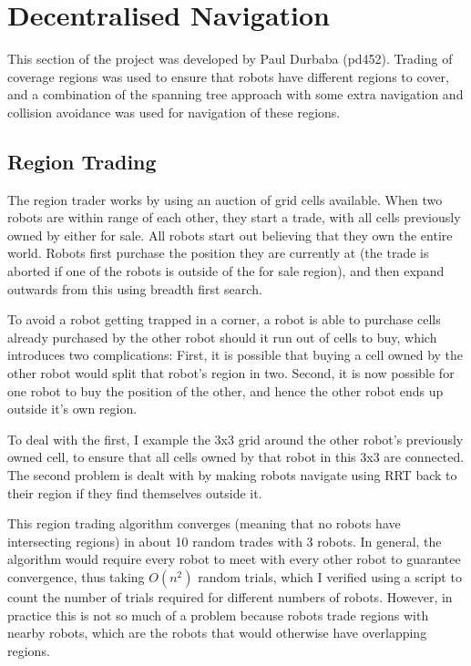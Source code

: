 \documentclass[a4paper, 10pt, conference]{ieeeconf}      %
\begin{document}
\section{Decentralised Navigation}
This section of the project was developed by Paul Durbaba (pd452). Trading of coverage regions was used to ensure that robots have different regions to cover, and a combination of the spanning tree approach with some extra navigation and collision avoidance was used for navigation of these regions.

\subsection{Region Trading}
The region trader works by using an auction of grid cells available. When two robots are within range of each other, they start a trade, with all cells previously owned by either for sale. All robots start out believing that they own the entire world. Robots first purchase the position they are currently at (the trade is aborted if one of the robots is outside of the for sale region), and then expand outwards from this using breadth first search.

To avoid a robot getting trapped in a corner, a robot is able to purchase cells already purchased by the other robot should it run out of cells to buy, which introduces two complications: First, it is possible that buying a cell owned by the other robot would split that robot's region in two. Second, it is now possible for one robot to buy the position of the other, and hence the other robot ends up outside it's own region.

To deal with the first, I example the 3x3 grid around the other robot's previously owned cell, to ensure that all cells owned by that robot in this 3x3 are connected. The second problem is dealt with by making robots navigate using RRT back to their region if they find themselves outside it.

This region trading algorithm converges (meaning that no robots have intersecting regions) in about 10 random trades with 3 robots. In general, the algorithm would require every robot to meet with every other robot to guarantee convergence, thus taking $O(n^2)$ random trials, which I verified using a script to count the number of trials required for different numbers of robots. However, in practice this is not so much of a problem because robots trade regions with nearby robots, which are the robots that would otherwise have overlapping regions.
\end{document}
